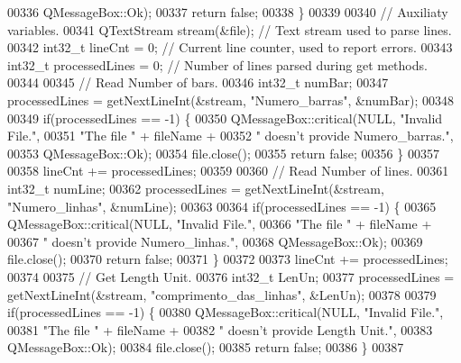 \begin{DoxyCode}
00336                           QMessageBox::Ok);
00337     \textcolor{keywordflow}{return} \textcolor{keyword}{false};
00338   \}
00339 
00340   \textcolor{comment}{// Auxiliaty variables.}
00341   QTextStream stream(&file); \textcolor{comment}{// Text stream used to parse lines.}
00342   int32\_t lineCnt = 0; \textcolor{comment}{// Current line counter, used to report errors.}
00343   int32\_t processedLines = 0; \textcolor{comment}{// Number of lines parsed during get methods.}
00344 
00345   \textcolor{comment}{// Read Number of bars.}
00346   int32\_t numBar;
00347   processedLines = getNextLineInt(&stream, \textcolor{stringliteral}{"Numero\_barras"}, &numBar);
00348 
00349   \textcolor{keywordflow}{if}(processedLines == -1) \{
00350     QMessageBox::critical(NULL, \textcolor{stringliteral}{"Invalid File."},
00351                           \textcolor{stringliteral}{"The file "} + fileName +
00352                           \textcolor{stringliteral}{" doesn't provide Numero\_barras."},
00353                           QMessageBox::Ok);
00354     file.close();
00355     \textcolor{keywordflow}{return} \textcolor{keyword}{false};
00356   \}
00357 
00358   lineCnt += processedLines;
00359 
00360   \textcolor{comment}{// Read Number of lines.}
00361   int32\_t numLine;
00362   processedLines = getNextLineInt(&stream, \textcolor{stringliteral}{"Numero\_linhas"}, &numLine);
00363 
00364   \textcolor{keywordflow}{if}(processedLines == -1) \{
00365     QMessageBox::critical(NULL, \textcolor{stringliteral}{"Invalid File."},
00366                           \textcolor{stringliteral}{"The file "} + fileName +
00367                           \textcolor{stringliteral}{" doesn't provide Numero\_linhas."},
00368                           QMessageBox::Ok);
00369     file.close();
00370     \textcolor{keywordflow}{return} \textcolor{keyword}{false};
00371   \}
00372 
00373   lineCnt += processedLines;
00374 
00375   \textcolor{comment}{// Get Length Unit.}
00376   int32\_t LenUn;
00377   processedLines = getNextLineInt(&stream, \textcolor{stringliteral}{"comprimento\_das\_linhas"}, &LenUn);
00378 
00379   \textcolor{keywordflow}{if}(processedLines == -1) \{
00380     QMessageBox::critical(NULL, \textcolor{stringliteral}{"Invalid File."},
00381                           \textcolor{stringliteral}{"The file "} + fileName +
00382                           \textcolor{stringliteral}{" doesn't provide Length Unit."},
00383                           QMessageBox::Ok);
00384     file.close();
00385     \textcolor{keywordflow}{return} \textcolor{keyword}{false};
00386   \}
00387 

\end{DoxyCode}
